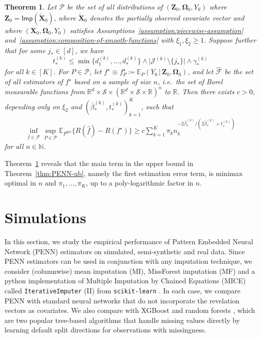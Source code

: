 \documentclass[12pt]{article}
\newtheorem{thm}{Theorem}
\def\hat{\widehat}
\def\tilde{\widetilde}
\begin{document}
\begin{thm} \label{thm:minimax-lb} 
    Let $\mathcal{P}$ be the set of all distributions of $(\bm Z_0,\bm\Omega_0,Y_0)$ where $\bm Z_0 = \mathsf{Imp}(\tilde{\bm X}_0)$, where $\tilde{\bm{X}}_0$ denotes the partially observed covariate vector and where $(\bm X_0, \bm \Omega_0, Y_0)$ satisfies Assumptions~\ref{assumption:piecewise-assumption} and~\ref{assumption:composition-of-smooth-functions} with $\xi_1,\xi_2\geq 1$.  Suppose further that for some $j_*\in[d]$, we have 
    \[  
    t_*^{(k)} \leq \min\bigl\{d_1^{(k)},\ldots,d_*^{(k)}\bigr\} \wedge \bigl|\mathcal{J}^{(k)} \setminus \{j_*\}\bigr| \wedge \gamma_*^{(k)}
    \]
    for all $k \in [K]$.  For $P\in\mathcal{P}$, let $f^{\star} \equiv f^{\star}_P \coloneqq \mathbb{E}_P(Y_0 \,|\, \bm Z_0,\bm\Omega_0)$, and let $\hat{\mathcal{F}}$ be the set of all estimators of $f^\star$ based on a sample of size $n$, i.e.~the set of Borel measurable functions from $\mathbb{R}^d \times \mathcal{S} \times (\mathbb{R}^d \times \mathcal{S} \times \mathbb{R})^n$ to $\mathbb{R}$. Then there exists $c>0$, depending only on $\xi_2$ and $(\bar{\beta}_*^{(k)}, t_*^{(k)})_{k=1}^K$, such that
    \begin{align*}
        \inf_{\hat{f} \in \hat{\mathcal{F}}} \sup_{P\in \mathcal{P}} \mathbb{E}_{P^{\otimes n}} \bigl\{R(\hat{f}) - R(f^{\star})\bigr\} \geq c \sum_{k=1}^K \pi_k n_k^{-2\bar{\beta}_*^{(k)} / (2\bar{\beta}_*^{(k)} + t_*^{(k)})}
    \end{align*}
    for all $n \in \mathbb{N}$.
\end{thm}
Theorem~\ref{thm:minimax-lb} reveals that the main term in the upper bound in Theorem~\ref{thm:PENN-ub}, namely the first estimation error term, is minimax optimal in $n$ and $\pi_1,\ldots,\pi_K$, up to a poly-logarithmic factor in $n$.  

\section{Simulations} \label{sec:simulations}

In this section, we study the empirical performance of Pattern Embedded Neural Network (PENN) estimators on simulated, semi-synthetic and real data.  Since PENN estimators can be used in conjunction with any imputation technique, we consider (columnwise) mean imputation (MI), MissForest imputation (MF) \citep{stekhoven2012missforest} and a python implementation of Multiple Imputation by Chained Equations (MICE) \citep{van2011mice} called  \texttt{IterativeImputer} (II) from \texttt{scikit-learn} \citep{pedregosa2011scikit}.  In each case, we compare PENN with standard neural networks that do not incorporate the revelation vectors as covariates. We also compare with XGBoost \citep{chen2016xgboost} and random forests \citep{breiman2001random}, which are two popular tree-based algorithms that handle missing values directly by learning default split directions for observations with missingness.  %
\end{document}
